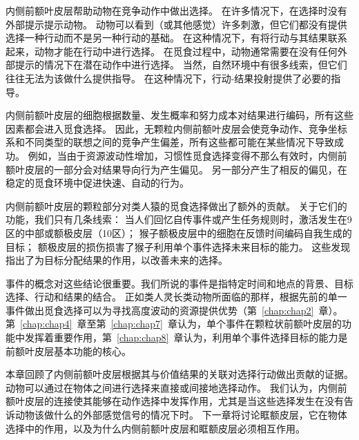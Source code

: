 内侧前额叶皮层帮助动物在竞争动作中做出选择。
在许多情况下，在选择时没有外部提示提示动物。
动物可以看到（或其他感觉）许多刺激，但它们都没有提供选择一种行动而不是另一种行动的基础。
在这种情况下，有将行动与其结果联系起来，动物才能在行动中进行选择。
在觅食过程中，动物通常需要在没有任何外部提示的情况下在潜在动作中进行选择。
当然，自然环境中有很多线索，但它们往往无法为该做什么提供指导。
在这种情况下，行动-结果投射提供了必要的指导。\par


内侧前额叶皮层的细胞根据数量、发生概率和努力成本对结果进行编码，所有这些因素都会进入觅食选择。
因此，无颗粒内侧前额叶皮层会使竞争动作、竞争坐标系和不同类型的联想之间的竞争产生偏差，所有这些都可能在某些情况下导致成功。
例如，当由于资源波动性增加，习惯性觅食选择变得不那么有效时，内侧前额叶皮层的一部分会对结果导向行为产生偏见。
另一部分产生了相反的偏见，在稳定的觅食环境中促进快速、自动的行为。\par


内侧前额叶皮层的颗粒部分对类人猿的觅食选择做出了额外的贡献。
关于它们的功能，我们只有几条线索：
当人们回忆自传事件或产生任务规则时，激活发生在9区的中部或额极皮层（10区）；
猴子额极皮层中的细胞在反馈时间编码自我生成的目标；
额极皮层的损伤损害了猴子利用单个事件选择未来目标的能力。
这些发现指出了为目标分配结果的作用，以改善未来的选择\cite{tsujimoto2011frontal}。\par
事件的概念对这些结论很重要。我们所说的事件是指特定时间和地点的背景、目标选择、行动和结果的结合。
正如类人灵长类动物所面临的那样，根据先前的单一事件做出觅食选择可以为寻找高度波动的资源提供优势（第~\ref{chap:chap2}~章）。
第~\ref{chap:chap4}~章至第~\ref{chap:chap7}~章认为，单个事件在颗粒状前额叶皮层的功能中发挥着重要作用，第~\ref{chap:chap8}~章认为，利用单个事件选择目标的能力是前额叶皮层基本功能的核心。\par
本章回顾了内侧前额叶皮层根据其与价值结果的关联对选择行动做出贡献的证据。
动物可以通过在物体之间进行选择来直接或间接地选择动作。
我们认为，内侧前额叶皮层的连接使其能够在动作选择中发挥作用，尤其是当这些选择发生在没有告诉动物该做什么的外部感觉信号的情况下时。
下一章将讨论眶额皮层，它在物体选择中的作用，以及为什么内侧前额叶皮层和眶额皮层必须相互作用。\par

